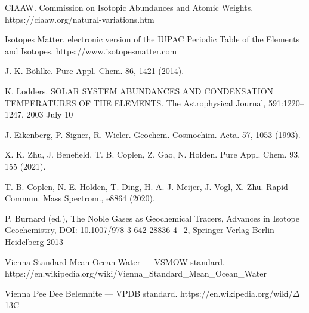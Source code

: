 \documentclass[a5paper,openany]{book}
\begin{document}
\begin{thebibliography}{99}
		 CIAAW. Commission on Isotopic Abundances and Atomic Weights. https://ciaaw.org/natural-variations.htm
		
		
		  Isotopes Matter,  electronic version of the IUPAC Periodic Table of the Elements and Isotopes.
		https://www.isotopesmatter.com
		
		
		 J. K. Böhlke. Pure Appl. Chem. 86, 1421 (2014).
		
		 K. Lodders. SOLAR SYSTEM ABUNDANCES AND CONDENSATION TEMPERATURES OF THE ELEMENTS. The Astrophysical Journal, 591:1220–1247, 2003 July 10
		
		 J. Eikenberg, P. Signer, R. Wieler. Geochem. Cosmochim. Acta. 57, 1053 (1993).
		
		 X. K. Zhu, J. Benefield, T. B. Coplen, Z. Gao, N. Holden. Pure Appl. Chem. 93, 155 (2021).
		
		T. B. Coplen, N. E. Holden, T. Ding, H. A. J. Meijer, J. Vogl, X. Zhu. Rapid Commun. Mass Spectrom., e8864 (2020).
		
		
		P. Burnard (ed.), The Noble Gases as Geochemical Tracers, Advances in Isotope Geochemistry,
		DOI: 10.1007/978-3-642-28836-4\_2,  Springer-Verlag Berlin Heidelberg 2013
		

		
		 Vienna Standard Mean Ocean Water --- VSMOW standard. 
		https://en.wikipedia.org/wiki/Vienna\_Standard\_Mean\_Ocean\_Water
		
		 Vienna Pee Dee Belemnite --- VPDB standard.
		https://en.wikipedia.org/wiki/$\Delta$13C

		

\end{thebibliography}
\end{document}
